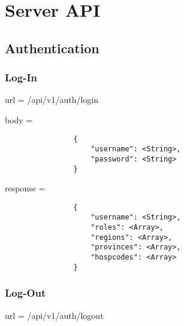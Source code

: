 \chapter{Server API}
    \section{Authentication}
        \subsection{Log-In}
            url = /api/v1/auth/login

            body =
            \begin{verbatim}
                { 
                    "username": <String>,
                    "password": <String>
                }
            \end{verbatim}

            response = 
            \begin{verbatim}
                { 
                    "username": <String>,
                    "roles": <Array>,
                    "regions": <Array>,
                    "provinces": <Array>,
                    "hospcodes": <Array>
                }
            \end{verbatim}
        
        \subsection{Log-Out}
            url = /api/v1/auth/logout
            
